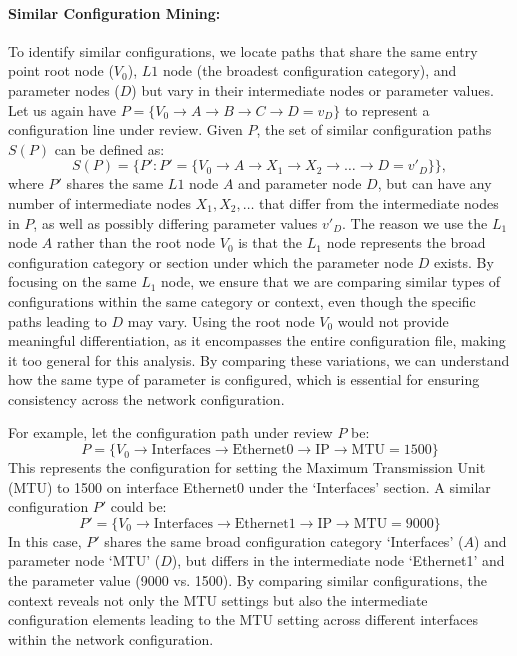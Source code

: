 \paragraph{Similar Configuration Mining:} To identify similar configurations, we locate paths that share the same entry point root node (\(V_0\)), \(L1\) node (the broadest configuration category), and parameter nodes (\(D\)) but vary in their intermediate nodes or parameter values. Let us again have \(
P = \{ V_0 \rightarrow A \rightarrow B \rightarrow C \rightarrow D = v_D \}
\) to represent a configuration line under review.
Given \( P \), the set of similar configuration paths \( S(P) \) can be defined as:
\[
S(P) = \{ P' : P' = \{ V_0 \rightarrow A \rightarrow X_1 \rightarrow X_2 \rightarrow \dots \rightarrow D = v'_D \} \},
\]
where \( P' \) shares the same \(L1\) node \( A \) and parameter node \( D \), but can have any number of intermediate nodes \( X_1, X_2, \dots \) that differ from the intermediate nodes in \( P \), as well as possibly differing parameter values \( v'_D \).
The reason we use the \( L_1 \) node \( A \) rather than the root node \( V_0 \) is that the \( L_1 \) node represents the broad configuration category or section under which the parameter node \( D \) exists. By focusing on the same \( L_1 \) node, we ensure that we are comparing similar types of configurations within the same category or context, even though the specific paths leading to \( D \) may vary. Using the root node \( V_0 \) would not provide meaningful differentiation, as it encompasses the entire configuration file, making it too general for this analysis. By comparing these variations, we can understand how the same type of parameter is configured, which is essential for ensuring consistency across the network configuration.

For example, let the configuration path under review \( P \) be:
\[
P = \{ V_0 \rightarrow \text{Interfaces} \rightarrow \text{Ethernet0} \rightarrow \text{IP} \rightarrow \text{MTU} = 1500 \}
\]
This represents the configuration for setting the Maximum Transmission Unit (MTU) to 1500 on interface Ethernet0 under the `Interfaces' section.
A similar configuration \( P' \) could be:
\[
P' = \{ V_0 \rightarrow \text{Interfaces} \rightarrow \text{Ethernet1} \rightarrow \text{IP} \rightarrow \text{MTU} = 9000 \}
\]
In this case, \( P' \) shares the same broad configuration category `Interfaces' (\( A \)) and parameter node `MTU' (\( D \)), but differs in the intermediate node `Ethernet1' and the parameter value (9000 vs. 1500). By comparing similar configurations, the context reveals not only the MTU settings but also the intermediate configuration elements leading to the MTU setting across different interfaces within the network configuration.


